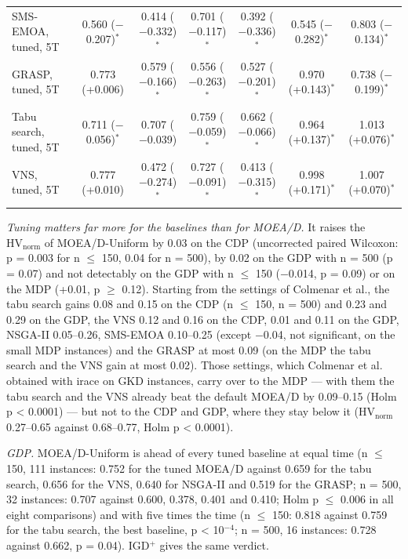 \begin{table}[t]
{\begin{tabular}{lcccccc}
SMS-EMOA, tuned, 5T & 0.560 ($-$0.207)$^{*}$ & 0.414 ($-$0.332)$^{*}$ & 0.701 ($-$0.117)$^{*}$ & 0.392 ($-$0.336)$^{*}$ & 0.545 ($-$0.282)$^{*}$ & 0.803 ($-$0.134)$^{*}$ \\
GRASP, tuned, 5T & 0.773 (+0.006) & 0.579 ($-$0.166)$^{*}$ & 0.556 ($-$0.263)$^{*}$ & 0.527 ($-$0.201)$^{*}$ & 0.970 (+0.143)$^{*}$ & 0.738 ($-$0.199)$^{*}$ \\
Tabu search, tuned, 5T & 0.711 ($-$0.056)$^{*}$ & 0.707 ($-$0.039) & 0.759 ($-$0.059)$^{*}$ & 0.662 ($-$0.066)$^{*}$ & 0.964 (+0.137)$^{*}$ & 1.013 (+0.076)$^{*}$ \\
VNS, tuned, 5T & 0.777 (+0.010) & 0.472 ($-$0.274)$^{*}$ & 0.727 ($-$0.091)$^{*}$ & 0.413 ($-$0.315)$^{*}$ & 0.998 (+0.171)$^{*}$ & 1.007 (+0.070)$^{*}$ \\
\bottomrule
\end{tabular}
}
\end{table}

\emph{Tuning matters far more for the baselines than for MOEA/D.} It raises the $\mathrm{HV}_{\mathrm{norm}}$ of MOEA/D-Uniform by 0.03 on the CDP (uncorrected paired Wilcoxon: p = 0.003 for n $\leq$ 150, 0.04 for n = 500), by 0.02 on the GDP with n = 500 (p = 0.07) and not detectably on the GDP with n $\leq$ 150 ($-$0.014, p = 0.09) or on the MDP (+0.01, p $\geq$ 0.12). Starting from the settings of Colmenar et al., the tabu search gains 0.08 and 0.15 on the CDP (n $\leq$ 150, n = 500) and 0.23 and 0.29 on the GDP, the VNS 0.12 and 0.16 on the CDP, 0.01 and 0.11 on the GDP, NSGA-II 0.05--0.26, SMS-EMOA 0.10--0.25 (except $-$0.04, not significant, on the small MDP instances) and the GRASP at most 0.09 (on the MDP the tabu search and the VNS gain at most 0.02). Those settings, which Colmenar et al. obtained with irace on GKD instances, carry over to the MDP --- with them the tabu search and the VNS already beat the default MOEA/D by 0.09--0.15 (Holm p < 0.0001) --- but not to the CDP and GDP, where they stay below it ($\mathrm{HV}_{\mathrm{norm}}$ 0.27--0.65 against 0.68--0.77, Holm p < 0.0001).

\emph{GDP.} MOEA/D-Uniform is ahead of every tuned baseline at equal time (n $\leq$ 150, 111 instances: 0.752 for the tuned MOEA/D against 0.659 for the tabu search, 0.656 for the VNS, 0.640 for NSGA-II and 0.519 for the GRASP; n = 500, 32 instances: 0.707 against 0.600, 0.378, 0.401 and 0.410; Holm p $\leq$ 0.006 in all eight comparisons) and with five times the time (n $\leq$ 150: 0.818 against 0.759 for the tabu search, the best baseline, p < 10$^{-4}$; n = 500, 16 instances: 0.728 against 0.662, p = 0.04). IGD$^{+}$ gives the same verdict.


